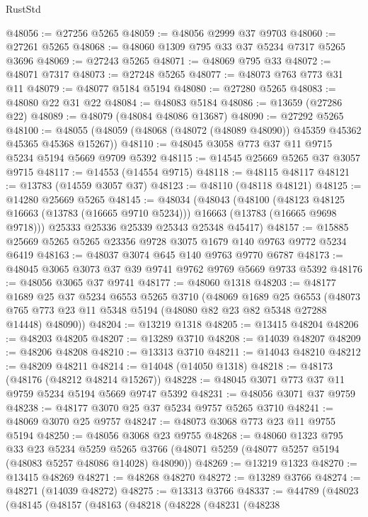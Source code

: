 \begin{lexlean}{RustStd}
\begin{coremodule}
@48056 := @27256 @5265
@48059 := @48056 @2999 @37 @9703
@48060 := @27261 @5265
@48068 := @48060 @1309 @795 @33 @37 @5234 @7317 @5265 @3696
@48069 := @27243 @5265
@48071 := @48069 @795 @33
@48072 := @48071 @7317
@48073 := @27248 @5265
@48077 := @48073 @763 @773 @31 @11
@48079 := @48077 @5184 @5194
@48080 := @27280 @5265
@48083 := @48080 @22 @31 @22
@48084 := @48083 @5184
@48086 := @13659 (@27286 @22)
@48089 := @48079 (@48084 @48086 @13687)
@48090 := @27292 @5265
@48100 := @48055 (@48059 (@48068 (@48072 (@48089 @48090)) @45359 @45362 @45365 @45368 @15267))
@48110 := @48045 @3058 @773 @37 @11 @9715 @5234 @5194 @5669 @9709 @5392
@48115 := @14545 @25669 @5265 @37 @3057 @9715
@48117 := @14553 (@14554 @9715)
@48118 := @48115 @48117
@48121 := @13783 (@14559 @3057 @37)
@48123 := @48110 (@48118 @48121)
@48125 := @14280 @25669 @5265
@48145 := @48034
    (@48043
      (@48100
        (@48123 @48125 @16663 (@13783 (@16665 @9710 @5234)))
        @16663
        (@13783 (@16665 @9698 @9718)))
      @25333
      @25336
      @25339
      @25343
      @25348
      @45417)
@48157 := @15885 @25669 @5265 @5265 @23356 @9728 @3075 @1679 @140 @9763 @9772 @5234 @6419
@48163 := @48037 @3074 @645 @140 @9763 @9770 @6787
@48173 := @48045 @3065 @3073 @37 @39 @9741 @9762 @9769 @5669 @9733 @5392
@48176 := @48056 @3065 @37 @9741
@48177 := @48060 @1318
@48203 := @48177
    @1689
    @25
    @37
    @5234
    @6553
    @5265
    @3710
    (@48069
      @1689
      @25
      @6553
      (@48073 @765 @773 @23 @11 @5348 @5194 (@48080 @82 @23 @82 @5348 @27288 @14448) @48090))
@48204 := @13219 @1318
@48205 := @13415 @48204
@48206 := @48203 @48205
@48207 := @13289 @3710
@48208 := @14039 @48207
@48209 := @48206 @48208
@48210 := @13313 @3710
@48211 := @14043 @48210
@48212 := @48209 @48211
@48214 := @14048 (@14050 @1318)
@48218 := @48173 (@48176 (@48212 @48214 @15267))
@48228 := @48045 @3071 @773 @37 @11 @9759 @5234 @5194 @5669 @9747 @5392
@48231 := @48056 @3071 @37 @9759
@48238 := @48177 @3070 @25 @37 @5234 @9757 @5265 @3710
@48241 := @48069 @3070 @25 @9757
@48247 := @48073 @3068 @773 @23 @11 @9755 @5194
@48250 := @48056 @3068 @23 @9755
@48268 := @48060
    @1323
    @795
    @33
    @23
    @5234
    @5259
    @5265
    @3766
    (@48071 @5259 (@48077 @5257 @5194 (@48083 @5257 @48086 @14028) @48090))
@48269 := @13219 @1323
@48270 := @13415 @48269
@48271 := @48268 @48270
@48272 := @13289 @3766
@48274 := @48271 (@14039 @48272)
@48275 := @13313 @3766
@48337 := @44789
    (@48023
      (@48145
        (@48157
          (@48163
            (@48218
              (@48228
                (@48231
                  (@48238

\end{coremodule}
\end{lexlean}
